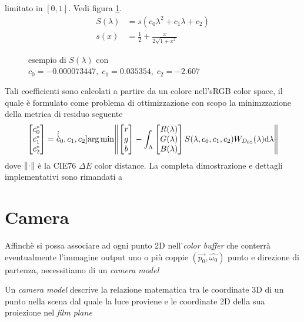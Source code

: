 limitato in $[0,1]$. Vedi figura \ref{chapter2:colorimetry:Slambda}.
\begin{align}\label{chapter2:colorimetry:rgb2spec}
	S(\lambda) &= s(c_0\lambda^2 + c_1\lambda + c_2)\\
	s(x) &= \frac{1}{2} + \frac{x}{2\sqrt{1+x^2}}
\end{align}
\begin{figure}[tb]
	\caption{esempio di $S(\lambda)$ con $c_0 = -0.000073447,\;c_1 = 0.035354,\;c_2 = -2.607$}
	\label{chapter2:colorimetry:Slambda}
\end{figure}
Tali coefficienti sono calcolati a partire da un colore nell'sRGB color space, il quale \`e formulato come problema di ottimizzazione con scopo la
minimzzazione della metrica di residuo seguente
\begin{equation}\label{chapter2:colorimetry:rgb2specResidual}
	\begin{bmatrix}
		c_0^* \\ c_1^* \\ c_2^*
	\end{bmatrix}
	= \;\stackrel[c_0,c_1,c_2]{}{\mathrm{arg}\,\mathrm{min}}\norm{
		\begin{bmatrix}
			r \\ g \\ b
		\end{bmatrix}
		- \int_\Lambda 
		\begin{bmatrix}
			R(\lambda) \\ G(\lambda) \\ B(\lambda)
		\end{bmatrix}
		S(\lambda, c_0, c_1, c_2) W_{D_{65}}(\lambda)\mathrm{d}\lambda
	}
\end{equation}
dove $\norm{\cdot}$ \`e la CIE76 $\Delta E$ color distance. La completa dimostrazione e dettagli implementativi sono rimandati a \cite{pharr}
\section{Camera}\label{chapter2:camera}
Affinch\`e si possa associare ad ogni punto 2D nell'\textit{color buffer} che conterr\`a eventualmente l'immagine output uno o pi\`u coppie 
$(\vec{p_0}, \hat{\omega_0})$ punto e direzione di partenza, necessitiamo di un \textit{camera model}
\begin{definitionS}
	Un \textit{camera model} descrive la relazione matematica tra le coordinate 3D di un punto nella scena dal quale la luce proviene e le coordinate 
	2D della sua proiezione nel \textit{film plane}\footnotemark{} \cite{vision}
\end{definitionS}
